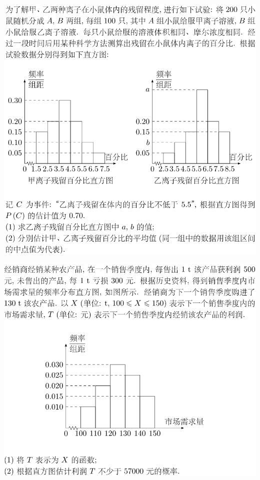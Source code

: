 \documentclass[11pt,a4paper]{ctexart}
\begin{document}
\begin{paracol}{2}
\includegraphics[width=\linewidth]{2019w17.png}
\newpage
{}

\includegraphics[width=\linewidth]{2013w19.png}
\newpage
{}


\end{paracol}
\end{document}
